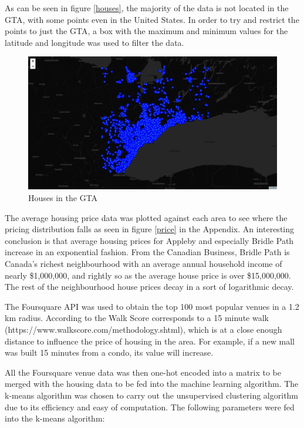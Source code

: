 \documentclass{article}
\begin{document}
As can be seen in figure \ref{houses}, the majority of the data is not located in the GTA, with some points even in the United States. In order to try and restrict the points to just the GTA, a box with the maximum and minimum values for the latitude and longitude was used to filter the data. 

\begin{figure}[h]
	\centering
	\includegraphics[width=\textwidth]{gta_houses_map.png}
	\caption{Houses in the GTA}
	\label{gta}
\end{figure}

The average housing price data was plotted against each area to see where the pricing distribution falls as seen in figure \ref{price} in the Appendix. An interesting conclusion is that average housing prices for Appleby and especially Bridle Path increase in an exponential fashion. From the Canadian Business, Bridle Path is Canada's richest neighbourhood with an average annual household income of nearly \$1,000,000, and rightly so as the average house price is over \$15,000,000. The rest of the neighbourhood house prices decay in a sort of logarithmic decay. 

The Foursquare API was used to obtain the top 100 most popular venues in a 1.2 km radius. According to the Walk Score corresponds to a 15 minute walk (https://www.walkscore.com/methodology.shtml), which is at a close enough distance to influence the price of housing in the area. For example, if a new mall was built 15 minutes from a condo, its value will increase. 

All the Foursquare venue data was then one-hot encoded into a matrix to be merged with the housing data to be fed into the machine learning algorithm. The k-means algorithm was chosen to carry out the unsupervised clustering algorithm due to its efficiency and easy of computation. The following parameters were fed into the k-means algorithm:
\end{document}
